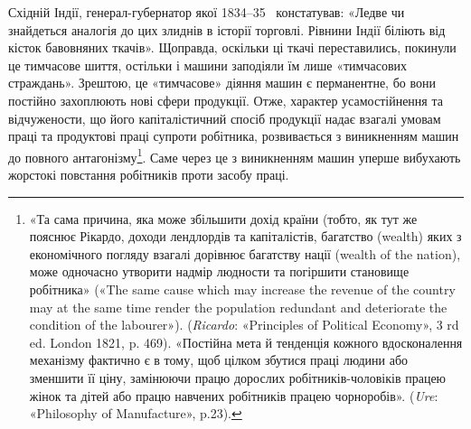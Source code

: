 Східній Індії, генерал-губернатор якої 1834--35~ констатував:
«Ледве чи знайдеться аналогія до цих злиднів в історії
торговлі. Рівнини Індії біліють від кісток бавовняних ткачів».
Щоправда, оскільки ці ткачі переставились, покинули це тимчасове
шиття, остільки і машини заподіяли їм лише «тимчасових
страждань». Зрештою, це «тимчасове» діяння машин є перманентне,
бо вони постійно захоплюють нові сфери продукції. Отже,
характер усамостійнення та відчужености, що його капіталістичний
спосіб продукції надає взагалі умовам праці та продуктові
праці супроти робітника, розвивається з виникненням
машин до повного антагонізму\footnote{
«Та сама причина, яка може збільшити дохід країни (тобто, як
тут же пояснює Рікардо, доходи лендлордів та капіталістів, багатство
(wealth) яких з економічного погляду взагалі дорівнює багатству нації
(wealth of the nation), може одночасно утворити надмір людности та
погіршити становище робітника» («The same cause which may increase
the revenue of the country may at the same time render the population
redundant and deteriorate the condition of the labourer»). (\emph{Ricardo}:
«Principles of Political Economy», 3 rd ed. London 1821, p. 469). «Постійна
мета й тенденція кожного вдосконалення механізму фактично є в тому,
щоб цілком збутися праці людини або зменшити її ціну, замінюючи працю
дорослих робітників-чоловіків працею жінок та дітей або працю навчених
робітників працею чорноробів». (\emph{Ure}: «Philosophy of Manufacture», p.23).
}. Саме через це з виникненням машин уперше вибухають жорстокі повстання
робітників проти засобу праці.

